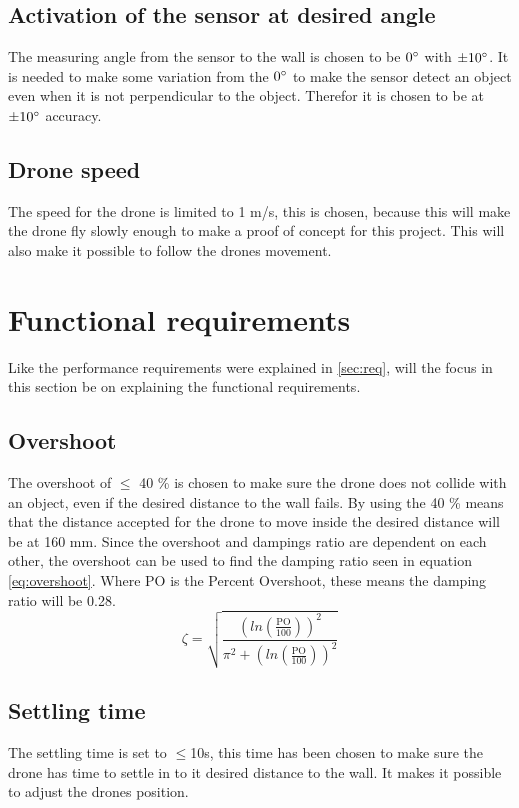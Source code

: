 \subsection*{Activation of the sensor at desired angle}
The measuring angle from the sensor to the wall is chosen to be $0\degree$ with $\pm 10 \degree$. It is needed to make some variation from the $0\degree$ to make the sensor detect an object even when it is not perpendicular to the object. Therefor it is chosen to be at $\pm 10 \degree$ accuracy.

\subsection*{Drone speed}
The speed for the drone is limited to 1 m/s, this is chosen, because this will make the drone fly slowly enough to make a proof of concept for this project. This will also make it possible to follow the drones movement.


\section{Functional requirements}
Like the performance requirements were explained in \ref{sec:req}, will the focus in this section be on explaining the functional requirements.

\subsection*{Overshoot}
The overshoot of $\leq$ 40 \% is chosen to make sure the drone does not collide with an object, even if the desired distance to the wall fails. By using the 40 \% means that the distance accepted for the drone to move inside the desired distance will be at 160 mm. 
Since the overshoot and dampings ratio are dependent on each other, the overshoot can be used to find the damping ratio seen in equation \ref{eq:overshoot}. Where PO is the Percent Overshoot, these means the damping ratio will be 0.28.
\begin{equation}\label{eq:overshoot}
   \zeta = \sqrt{\frac{(ln(\frac{\text{PO}}{100}))^{2}}{\pi^{2}+(ln(\frac{\text{PO}}{100}))^{2}}}
\end{equation}
\subsection*{Settling time}
The settling time is set to $\leq$10s, this time has been chosen to make sure the drone has time to settle in to it desired distance to the wall. It makes it possible to adjust the drones position. 
